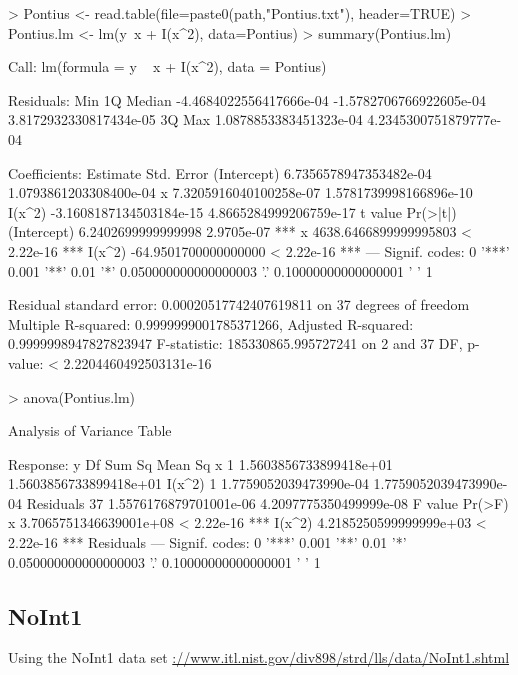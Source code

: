 \documentclass[10pt]{article}
\begin{document}
\begin{Schunk}
\begin{Sinput}
> Pontius <- read.table(file=paste0(path,"Pontius.txt"), header=TRUE)
> Pontius.lm <- lm(y~x + I(x^2), data=Pontius)
> summary(Pontius.lm)
\end{Sinput}
\begin{Soutput}
Call:
lm(formula = y ~ x + I(x^2), data = Pontius)

Residuals:
                    Min                      1Q                  Median 
-4.4684022556417666e-04 -1.5782706766922605e-04  3.8172932330817434e-05 
                     3Q                     Max 
 1.0878853383451323e-04  4.2345300751879777e-04 

Coefficients:
                           Estimate              Std. Error
(Intercept)  6.7356578947353482e-04  1.0793861203308400e-04
x            7.3205916040100258e-07  1.5781739998166896e-10
I(x^2)      -3.1608187134503184e-15  4.8665284999206759e-17
                          t value   Pr(>|t|)    
(Intercept)    6.2402699999999998 2.9705e-07 ***
x           4638.6466899999995803 < 2.22e-16 ***
I(x^2)       -64.9501700000000000 < 2.22e-16 ***
---
Signif. codes:  
0 '***' 0.001 '**' 0.01 '*' 0.050000000000000003 '.' 0.10000000000000001 ' ' 1

Residual standard error: 0.00020517742407619811 on 37 degrees of freedom
Multiple R-squared:  0.9999999001785371266,	Adjusted R-squared:  0.9999998947827823947 
F-statistic:  185330865.995727241 on 2 and 37 DF,  p-value: < 2.2204460492503131e-16
\end{Soutput}
\begin{Sinput}
> anova(Pontius.lm)
\end{Sinput}
\begin{Soutput}
Analysis of Variance Table

Response: y
          Df                 Sum Sq                Mean Sq
x          1 1.5603856733899418e+01 1.5603856733899418e+01
I(x^2)     1 1.7759052039473990e-04 1.7759052039473990e-04
Residuals 37 1.5576176879701001e-06 4.2097775350499999e-08
                         F value     Pr(>F)    
x         3.7065751346639001e+08 < 2.22e-16 ***
I(x^2)    4.2185250599999999e+03 < 2.22e-16 ***
Residuals                                      
---
Signif. codes:  
0 '***' 0.001 '**' 0.01 '*' 0.050000000000000003 '.' 0.10000000000000001 ' ' 1
\end{Soutput}
\end{Schunk}

\subsection{NoInt1}
Using the NoInt1 data set \url{://www.itl.nist.gov/div898/strd/lls/data/NoInt1.shtml}
\end{document}

